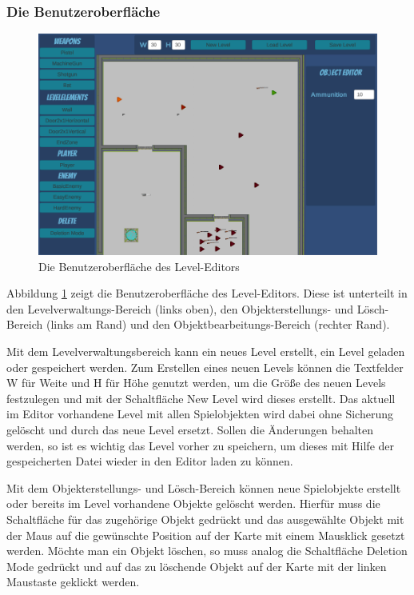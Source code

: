 \subsubsection{Die Benutzeroberfläche}
\begin {figure}[h]
	\begin {center}
	    \includegraphics[width=1\textwidth]{pics/leveleditor_interface.png}
		\caption{Die Benutzeroberfläche des Level-Editors}
		\label{fig:userinterface_leveleditor}
	\end {center}
\end {figure}

Abbildung \ref{fig:userinterface_leveleditor} zeigt die Benutzeroberfläche des Level-Editors. Diese ist unterteilt in den Le\-vel\-ver\-wal\-tungs-Bereich (links oben), den Objekterstellungs- und Lösch-Bereich (links am Rand) und den Objektbearbeitungs-Bereich (rechter Rand). 

Mit dem Levelverwaltungsbereich kann ein neues Level erstellt, ein Level geladen oder gespeichert werden. Zum Erstellen eines neuen Levels können die Textfelder \glqq{}W\grqq{} für Weite und \glqq{}H\grqq{} für Höhe genutzt werden, um die Größe des neuen Levels festzulegen und mit der Schaltfläche \glqq{}New Level\grqq{} wird dieses erstellt. Das aktuell im Editor vorhandene Level mit allen Spielobjekten wird dabei ohne Sicherung gelöscht und durch das neue Level ersetzt. Sollen die Änderungen behalten werden, so ist es wichtig das Level vorher zu speichern, um dieses mit Hilfe der gespeicherten Datei wieder in den Editor laden zu können.

Mit dem Objekterstellungs- und Lösch-Bereich können neue Spielobjekte erstellt oder bereits im Level vorhandene Objekte gelöscht werden. Hierfür muss die Schaltfläche für das zugehörige Objekt gedrückt und das ausgewählte Objekt mit der Maus auf die gewünschte Position auf der Karte mit einem Mausklick gesetzt werden. Möchte man ein Objekt löschen, so muss analog die Schaltfläche \glqq{}Deletion Mode\grqq{} gedrückt und auf das zu löschende Objekt auf der Karte mit der linken Maustaste geklickt werden.

